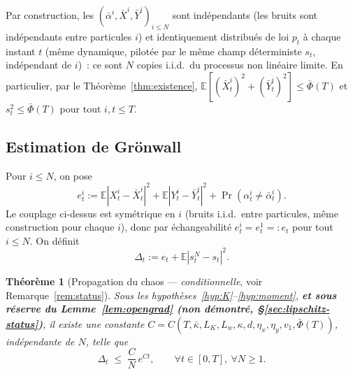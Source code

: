 \documentclass[11pt,a4paper]{article}
\newcommand{\E}{\mathbb{E}}
\theoremstyle{plain}
\newtheorem{thm}{Théorème}[section]
\theoremstyle{definition}
\begin{document}
Par construction, les $(\bar\alpha^i,\bar X^i,\bar Y^i)_{i\le N}$ sont ind\'ependants (les bruits sont ind\'ependants entre particules $i$) et identiquement distribu\'es de loi $p_t$ \`a chaque instant $t$ (m\^eme dynamique, pilot\'ee par le m\^eme champ d\'eterministe $s_t$, ind\'ependant de $i$)~: ce sont $N$ copies i.i.d.\ du processus non lin\'eaire limite. En particulier, par le Th\'eor\`eme~\ref{thm:existence}, $\E[(\bar X_t^i)^2+(\bar Y_t^i)^2]\le\bar\Phi(T)$ et $s_t^2\le\bar\Phi(T)$ pour tout $i,t\le T$.

\subsection{Estimation de Gr\"onwall}

Pour $i\le N$, on pose
\[
e_t^i := \E|X_t^i-\bar X_t^i|^2+\E|Y_t^i-\bar Y_t^i|^2+\Pr(\alpha_t^i\ne\bar\alpha_t^i).
\]
Le couplage ci-dessus est sym\'etrique en $i$ (bruits i.i.d.\ entre particules, m\^eme construction pour chaque $i$), donc par \'echangeabilit\'e $e_t^i=e_t^1=:e_t$ pour tout $i\le N$. On d\'efinit
\[
\Delta_t := e_t + \E|s_t^N-s_t|^2.
\]

\begin{thm}[Propagation du chaos --- \emph{conditionnelle}, voir Remarque~\ref{rem:status}]
\label{thm:pdc}
Sous les hypoth\`eses~\ref{hyp:K}--\ref{hyp:moment}, \textbf{et sous r\'eserve du Lemme~\ref{lem:opengrad} (non d\'emontr\'e, \S\ref{sec:lipschitz-status})}, il existe une constante $C=C(T,\bar\kappa,L_K,L_w,\kappa,d,\eta_x,\eta_y,v_1,\bar\Phi(T))$, ind\'ependante de $N$, telle que
\[
\Delta_t \;\le\; \frac{C}{N}\,e^{Ct}, \qquad \forall t\in[0,T],\ \forall N\ge1.
\]
\end{thm}
\end{document}
